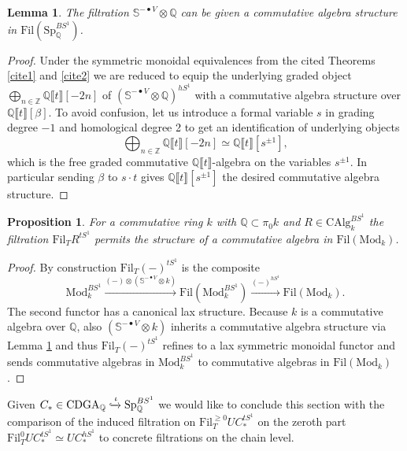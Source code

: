 \documentclass[10pt, reqno]{amsart}
\newtheorem{lemma}[theorem]{Lemma}
\newtheorem{proposition}[theorem]{Proposition}
\theoremstyle{definition}
\theoremstyle{remark}
\newcommand{\Q}{\mathbb{Q}}
\newcommand{\Z}{\mathbb{Z}}
\newcommand{\CAlg}{\mathrm{CAlg}}
\newcommand{\Sp}{\mathrm{Sp}}
\newcommand{\Fil}{\mathrm{Fil}}
\renewcommand{\S}{\mathbb{S}}
\newcommand{\llrrbra}[1]{\llbracket #1\rrbracket}
\newcommand{\Mod}{\mathrm{Mod}}
\newcommand{\CDGA}{\mathrm{CDGA}}
\begin{document}
\begin{lemma}\label{mult}
	The filtration $\S^{-\bullet V}\otimes \Q$ can be given a commutative algebra structure in $\Fil(\Sp_\Q^{BS^1})$.
\end{lemma}
\begin{proof}
	Under the symmetric monoidal equivalences from the cited Theorems \ref{cite1} and \ref{cite2} we are reduced to equip the underlying graded object $\bigoplus_{n\in\Z}\Q\llrrbra t[-2n]$ of $(\S^{-\bullet V}\otimes \Q)^{hS^1}$ with a commutative algebra structure over $\Q\llrrbra t[\beta]$. To avoid confusion, let us introduce a formal variable $s$ in grading degree $-1$ and homological degree 2 to get an identification of underlying objects
	\[\bigoplus_{n\in\Z}\Q\llrrbra t[-2n]\simeq \Q\llrrbra t[s^{\pm 1}],\]
	which is the free graded commutative $\Q\llrrbra t$-algebra on the variables $s^{\pm 1}$. In particular sending $\beta$ to $s\cdot t$ gives $\Q\llrrbra t[s^{\pm 1}]$ the desired commutative algebra structure.
\end{proof}

\begin{proposition}
	For a commutative ring $k$ with $\Q\subset \pi_0 k$ and $R\in\CAlg_k^{BS^1}$ the filtration $\Fil_T R^{tS^1}$ permits the structure of a commutative algebra in $\Fil(\Mod_k)$.
\end{proposition}
\begin{proof}
	By construction $\Fil_T (-)^{tS^1}$ is the composite
	\[\Mod_k^{BS^1}\xrightarrow{(-)\otimes (\S^{-\bullet V}\otimes k)}\Fil(\Mod_k^{BS^1})\xrightarrow{(-)^{hS^1}}\Fil(\Mod_k).\]
	The second functor has a canonical lax structure. Because $k$ is a commutative algebra over $\Q$, also $(\S^{-\bullet V}\otimes k)$ inherits a commutative algebra structure via Lemma \ref{mult} and thus $\Fil_T(-)^{tS^1}$ refines to a lax symmetric monoidal functor and sends commutative algebras in $\Mod_k^{BS^1}$ to commutative algebras in $\Fil(\Mod_k)$.
\end{proof}

Given $C_*\in\CDGA_\Q\xhookrightarrow\iota\Sp_\Q^{BS^1}$ we would like to conclude this section with the comparison of the induced filtration on $\Fil_T^{\geq 0} UC_*^{tS^1}$ on the zeroth part $\Fil_T^0 UC_*^{tS^1}\simeq UC_*^{hS^1}$ to concrete filtrations on the chain level. 
\end{document}

